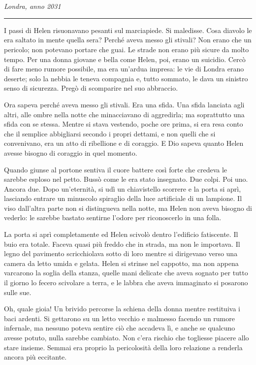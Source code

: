 \chapter{}
\label{ch:1}

\emph{Londra, anno 2031}
\plainbreak{1}

I passi di Helen risuonavano pesanti sul marciapiede. Si maledisse. Cosa diavolo le era saltato in
mente quella sera? Perché aveva messo gli stivali? Non erano che un pericolo; non potevano portare
che guai. Le strade non erano più sicure da molto tempo. Per una donna giovane e bella come Helen,
poi, erano un suicidio. Cercò di fare meno rumore possibile, ma era un'ardua impresa: le vie di
Londra erano deserte; solo la nebbia le teneva compagnia e, tutto sommato, le dava un sinistro senso
di sicurezza. Pregò di scomparire nel suo abbraccio.

Ora sapeva perché aveva messo gli stivali. Era una sfida. Una sfida lanciata agli altri, alle ombre
nella notte che minacciavano di aggredirla; ma soprattutto una sfida con se stessa. Mentre si stava
vestendo, poche ore prima, si era resa conto che il semplice abbigliarsi secondo i propri dettami, e
non quelli che si convenivano, era un atto di ribellione e di coraggio. E Dio sapeva quanto Helen
avesse bisogno di coraggio in quel momento.

Quando giunse al portone sentiva il cuore battere così forte che credeva le sarebbe esploso nel
petto. Bussò come le era stato insegnato. Due colpi. Poi uno. Ancora due. Dopo un'eternità, si udì
un chiavistello scorrere e la porta si aprì, lasciando entrare un minuscolo spiraglio della luce
artificiale di un lampione. Il viso dall'altra parte non si distingueva nella notte, ma Helen non
aveva bisogno di vederlo: le sarebbe bastato sentirne l'odore per riconoscerlo in una folla.

La porta si aprì completamente ed Helen scivolò dentro l'edificio fatiscente. Il buio era totale.
Faceva quasi più freddo che in strada, ma non le importava. Il legno del pavimento scricchiolava
sotto di loro mentre si dirigevano verso una camera da letto umida e gelata. Helen si strinse nel
cappotto, ma non appena varcarono la soglia della stanza, quelle mani delicate che aveva sognato per
tutto il giorno lo fecero scivolare a terra, e le labbra che aveva immaginato si posarono sulle sue.

Oh, quale gioia! Un brivido percorse la schiena della donna mentre restituiva i baci ardenti. Si
gettarono su un letto vecchio e malmesso facendo un rumore infernale, ma nessuno poteva sentire ciò
che accadeva lì, e anche se qualcuno avesse potuto, nulla sarebbe cambiato. Non c'era rischio che
togliesse piacere allo stare insieme. Semmai era proprio la pericolosità della loro relazione a
renderla ancora più eccitante.

